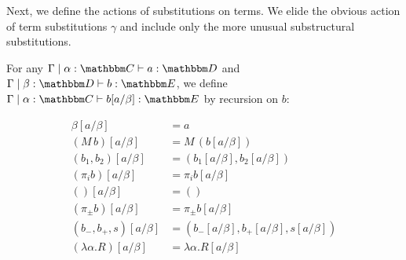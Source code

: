 \documentclass{llncs}
\begin{document}
Next, we define the actions of substitutions on terms. We elide the
obvious action of term substitutions $\gamma$ and include only the
more unusual substructural substitutions.
\begin{definition}
  For any $\Gamma \pipe \alpha: \cat C \vdash a : \cat D$ and $\Gamma
  \pipe \beta:\cat D \vdash b : \cat E$, we define
  $\Gamma \pipe \alpha : \cat C \vdash b[a/\beta] : \cat E$ by recursion on $b$:

  \begin{align*}
    \beta[a/\beta] &= a\\
    (M\,b)[a/\beta] &= M\,(b[a/\beta])\\
    (b_1,b_2)[a/\beta] &= (b_1[a/\beta],b_2[a/\beta])\\
    (\pi_i b)[a/\beta] &= \pi_i b[a/\beta]\\
    () [a/\beta] &= () \\
    (\pi_\pm b)[a/\beta] &= \pi_\pm b[a/\beta]\\
    (b_-,b_+,s)[a/\beta] &= (b_-[a/\beta],b_+[a/\beta], s[a/\beta])\\
    (\lambda \alpha.R)[a/\beta] &=\lambda \alpha.R[a/\beta] %
  \end{align*}


\end{definition}
\end{document}
